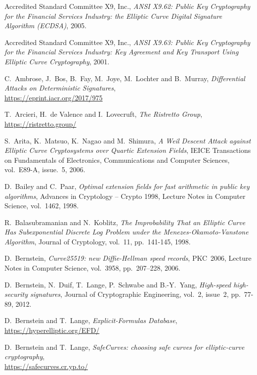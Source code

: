 \documentclass{llncs}
\begin{document}
\begin{thebibliography}{20}

Accredited Standard Committee X9, Inc.,
\emph{ANSI X9.62: Public Key Cryptography for the Financial Services
Industry: the Elliptic Curve Digital Signature Algorithm (ECDSA)},
2005.

Accredited Standard Committee X9, Inc.,
\emph{ANSI X9.63: Public Key Cryptography for the Financial Services
Industry: Key Agreement and Key Transport Using Elliptic Curve
Cryptography},
2001.

C.~Ambrose, J.~Bos, B.~Fay, M.~Joye, M.~Lochter and B.~Murray,
\emph{Differential Attacks on Deterministic Signatures},\\
\url{https://eprint.iacr.org/2017/975}

T.~Arcieri, H.~de Valence and I.~Lovecruft,
\emph{The Ristretto Group},\\
\url{https://ristretto.group/}

S.~Arita, K.~Matsuo, K.~Nagao and M.~Shimura,
\emph{A Weil Descent Attack against Elliptic Curve Cryptosystems over
Quartic Extension Fields},
IEICE Transactions on Fundamentals of Electronics, Communications and
Computer Sciences, vol.~E89-A, issue.~5, 2006.

D.~Bailey and C.~Paar,
\emph{Optimal extension fields for fast arithmetic in public key algorithms},
Advances in Cryptology – Crypto 1998, Lecture Notes in Computer Science,
vol.~1462, 1998.

R.~Balasubramanian and N.~Koblitz,
\emph{The Improbability That an Elliptic Curve Has Subexponential
Discrete Log Problem under the Menezes-Okamoto-Vanstone Algorithm},
Journal of Cryptology, vol.~11, pp.~141-145, 1998.

D.~Bernstein,
\emph{Curve25519: new Diffie-Hellman speed records},
PKC~2006, Lecture Notes in Computer Science, vol.~3958, pp.~207--228,
2006.

D.~Bernstein, N.~Duif, T.~Lange, P.~Schwabe and B.-Y.~Yang,
\emph{High-speed high-security signatures},
Journal of Cryptographic Engineering, vol.~2, issue~2, pp.~77-89, 2012.

D.~Bernstein and T.~Lange,
\emph{Explicit-Formulas Database},\\
\url{https://hyperelliptic.org/EFD/}

D.~Bernstein and T.~Lange,
\emph{SafeCurves: choosing safe curves for elliptic-curve cryptography},\\
\url{https://safecurves.cr.yp.to/}


\end{thebibliography}
\end{document}
